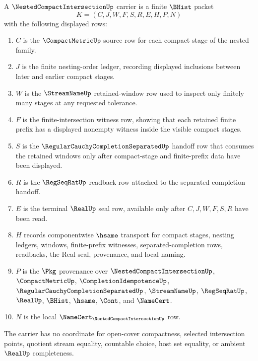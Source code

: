 \begin{definition}
\label{def:nested-compact-intersection-carrier}
A $\NestedCompactIntersectionUp$ carrier is a finite $\BHist$ packet
$$
K=(C,J,W,F,S,R,E,H,P,N)
$$
with the following displayed rows:
\begin{enumerate}
\item $C$ is the $\CompactMetricUp$ source row for each compact stage of the nested family.
\item $J$ is the finite nesting-order ledger, recording displayed inclusions between later and earlier compact stages.
\item $W$ is the $\StreamNameUp$ retained-window row used to inspect only finitely many stages at any requested tolerance.
\item $F$ is the finite-intersection witness row, showing that each retained finite prefix has a displayed nonempty witness inside the visible compact stages.
\item $S$ is the $\RegularCauchyCompletionSeparatedUp$ handoff row that consumes the retained windows only after compact-stage and finite-prefix data have been displayed.
\item $R$ is the $\RegSeqRatUp$ readback row attached to the separated completion handoff.
\item $E$ is the terminal $\RealUp$ seal row, available only after $C,J,W,F,S,R$ have been read.
\item $H$ records componentwise $\hsame$ transport for compact stages, nesting ledgers, windows, finite-prefix witnesses, separated-completion rows, readbacks, the Real seal, provenance, and local naming.
\item $P$ is the $\Pkg$ provenance over $\NestedCompactIntersectionUp$, $\CompactMetricUp$, $\CompletionIdempotenceUp$, $\RegularCauchyCompletionSeparatedUp$, $\StreamNameUp$, $\RegSeqRatUp$, $\RealUp$, $\BHist$, $\hsame$, $\Cont$, and $\NameCert$.
\item $N$ is the local $\NameCert_{\NestedCompactIntersectionUp}$ row.
\end{enumerate}
The carrier has no coordinate for open-cover compactness, selected intersection points, quotient stream equality, countable choice, host set equality, or ambient $\RealUp$ completeness.
\end{definition}

